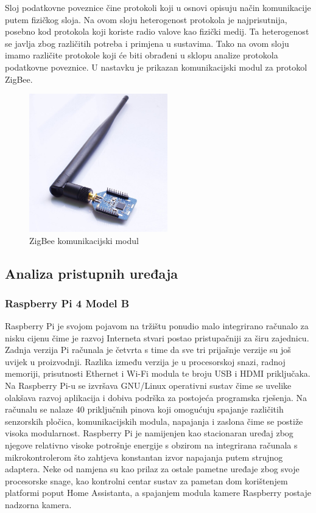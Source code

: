 \documentclass[times, utf8, diplomski]{fer}
\begin{document}
Sloj podatkovne poveznice čine protokoli koji u osnovi opisuju način komunikacije putem fizičkog sloja. Na ovom sloju heterogenost protokola je najprisutnija, posebno kod protokola koji koriste radio valove kao fizički medij. Ta heterogenost se javlja zbog različitih potreba i primjena u sustavima. Tako na ovom sloju imamo različite protokole koji će biti obrađeni u sklopu analize protokola podatkovne poveznice. U nastavku je prikazan komunikacijski modul za protokol ZigBee.
\begin{figure}[htb]
    \centering
    \includegraphics[width=6cm]{images/zigbee-module.jpg}
    \caption{ZigBee komunikacijski modul\citep{ZigBeemodule}}
    \label{fig:zigbeemodule}
\end{figure}

\subsection{Analiza pristupnih uređaja}
\subsubsection{Raspberry Pi 4 Model B}
Raspberry Pi je svojom pojavom na tržištu ponudio malo integrirano računalo za nisku cijenu čime je razvoj Interneta stvari postao pristupačniji za širu zajednicu. Zadnja verzija Pi računala je četvrta s time da sve tri prijašnje verzije su još uvijek u proizvodnji. Razlika između verzija je u procesorskoj snazi, radnoj memoriji, prisutnosti Ethernet i Wi-Fi modula te broju USB i HDMI priključaka. Na Raspberry Pi-u se izvršava GNU/Linux operativni sustav čime se uvelike olakšava razvoj aplikacija i dobiva podrška za postojeća programska rješenja. Na računalu se nalaze 40 priključnih pinova koji omogućuju spajanje različitih senzorskih pločica, komunikacijskih modula, napajanja i zaslona čime se postiže visoka modularnost. Raspberry Pi je namijenjen kao stacionaran uređaj zbog njegove relativno visoke potrošnje energije s obzirom na integrirana računala s mikrokontrolerom što zahtjeva konstantan izvor napajanja putem strujnog adaptera. Neke od namjena su kao prilaz za ostale pametne uređaje zbog svoje procesorske snage, kao kontrolni centar sustav za pametan dom korištenjem platformi poput Home Assistanta, a spajanjem modula kamere Raspberry postaje nadzorna kamera. 
\end{document}
